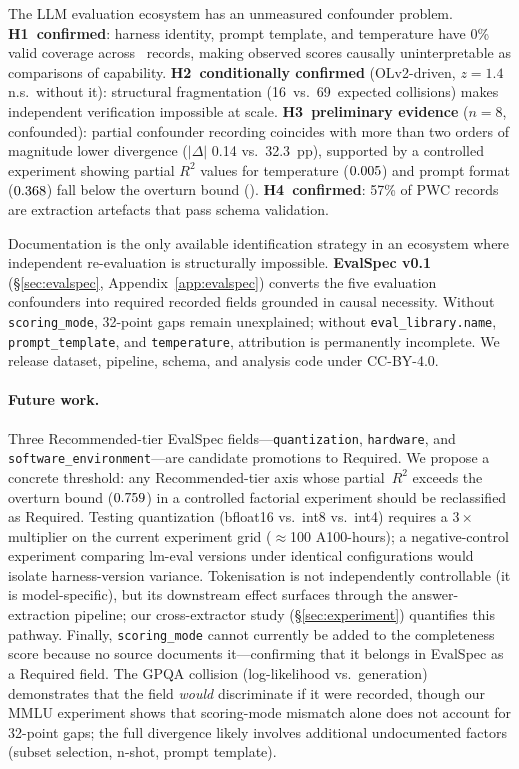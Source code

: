 \documentclass[11pt]{article}
\begin{document}
The LLM evaluation ecosystem has an unmeasured confounder
problem. \textbf{H1~confirmed}: harness identity, prompt template, and
temperature have 0\% valid coverage across
\totalrecords{}~records, making observed scores causally
uninterpretable as comparisons of capability. \textbf{H2~conditionally confirmed} (OLv2-driven,
$z = 1.4$ n.s.\ without it): structural fragmentation
(16~vs.\ 69~expected collisions) makes independent verification
impossible at scale. \textbf{H3~preliminary evidence} ($n = 8$,
confounded): partial confounder recording coincides with more
than two orders of magnitude lower divergence ($|\Delta|$
0.14 vs.\ 32.3~pp), supported by a controlled experiment showing partial
$R^2$ values for temperature ($0.005{}$) and prompt
format ($0.368{}$) fall below the overturn bound
(\overturnbound{}). \textbf{H4~confirmed}: 57\% of PWC records
are extraction artefacts that pass schema validation.

Documentation is the only available identification strategy in
an ecosystem where independent re-evaluation is structurally
impossible. \textbf{EvalSpec v0.1} (\S\ref{sec:evalspec},
Appendix~\ref{app:evalspec}) converts the five evaluation
confounders into required recorded fields grounded in causal
necessity. Without \texttt{scoring\_mode}, 32-point gaps remain
unexplained; without \texttt{eval\_library.name},
\texttt{prompt\_template}, and
\texttt{temperature}, attribution is permanently incomplete. We
release dataset, pipeline, schema, and analysis code under
CC-BY-4.0.

\paragraph{Future work.}
Three Recommended-tier EvalSpec fields---\texttt{quantization},
\texttt{hardware}, and \texttt{software\_environment}---are
candidate promotions to Required. We propose a concrete threshold:
any Recommended-tier axis whose partial~$R^2$ exceeds the overturn
bound ($0.759{}$) in a controlled factorial experiment
should be reclassified as Required. Testing quantization
(bfloat16 vs.\ int8 vs.\ int4) requires a $3\times$ multiplier on
the current experiment grid ($\approx$100 A100-hours); a
negative-control experiment comparing lm-eval versions under
identical configurations would isolate harness-version variance.
Tokenisation is not independently controllable (it is
model-specific), but its downstream effect surfaces through the
answer-extraction pipeline; our cross-extractor study
(\S\ref{sec:experiment}) quantifies this pathway.
Finally, \texttt{scoring\_mode} cannot currently be added to the
completeness score because no source documents it---confirming that
it belongs in EvalSpec as a Required field. The GPQA collision
(log-likelihood vs.\ generation) demonstrates that the field
\emph{would} discriminate if it were recorded, though our MMLU
experiment shows that scoring-mode mismatch alone does not account
for 32-point gaps; the full divergence likely involves additional
undocumented factors (subset selection, n-shot, prompt template).
\end{document}
